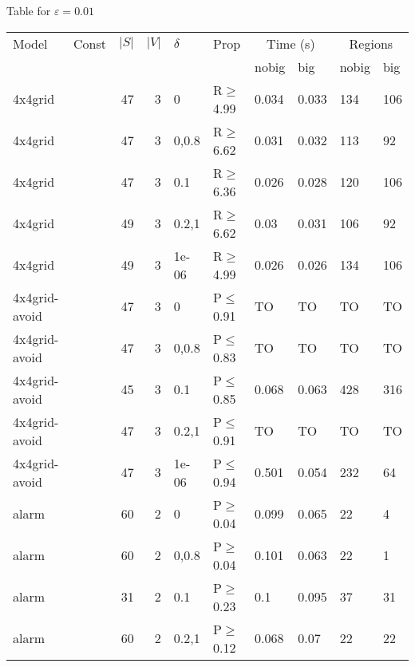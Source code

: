 \small Table for \(\varepsilon=0.01\)
\begin{longtable}{llrrllllll}

        \toprule
        Model & Const & $|S|$ & $|V|$ & $\delta$ & Prop & \multicolumn{2}{c}{Time (s)} & \multicolumn{2}{c}{Regions} \\
        \cmidrule(ll){7-8} \cmidrule(ll){9-10}
        & & & & & & nobig & big & nobig & big \\
        \midrule
        
 4x4grid       &           &     	47 &   3 & 0     & R$\geq$4.99  & 0.034   & 0.033    & 134    & 106    \\
 4x4grid       &           &     	47 &   3 & 0,0.8 & R$\geq$6.62  & 0.031   & 0.032    & 113    & 92     \\
 4x4grid       &           &     	47 &   3 & 0.1   & R$\geq$6.36  & 0.026   & 0.028    & 120    & 106    \\
 4x4grid       &           &     	49 &   3 & 0.2,1 & R$\geq$6.62  & 0.03    & 0.031    & 106    & 92     \\
 4x4grid       &           &     	49 &   3 & 1e-06 & R$\geq$4.99  & 0.026   & 0.026    & 134    & 106    \\
 4x4grid-avoid &           &     	47 &   3 & 0     & P$\leq$0.91  & TO      & TO       & TO     & TO     \\
 4x4grid-avoid &           &     	47 &   3 & 0,0.8 & P$\leq$0.83  & TO      & TO       & TO     & TO     \\
 4x4grid-avoid &           &     	45 &   3 & 0.1   & P$\leq$0.85  & 0.068   & 0.063    & 428    & 316    \\
 4x4grid-avoid &           &     	47 &   3 & 0.2,1 & P$\leq$0.91  & TO      & TO       & TO     & TO     \\
 4x4grid-avoid &           &     	47 &   3 & 1e-06 & P$\leq$0.94  & 0.501   & 0.054    & 232    & 64     \\
 alarm         &           &     	60 &   2 & 0     & P$\geq$0.04  & 0.099   & 0.065    & 22     & 4      \\
 alarm         &           &     	60 &   2 & 0,0.8 & P$\geq$0.04  & 0.101   & 0.063    & 22     & 1      \\
 alarm         &           &     	31 &   2 & 0.1   & P$\geq$0.23  & 0.1     & 0.095    & 37     & 31     \\
 alarm         &           &     	60 &   2 & 0.2,1 & P$\geq$0.12  & 0.068   & 0.07     & 22     & 22     \\

\end{longtable}
